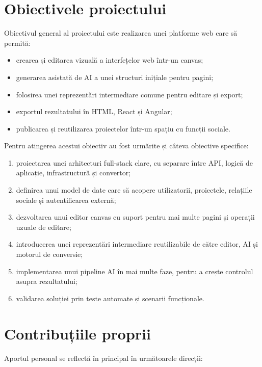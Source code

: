 \section{Obiectivele proiectului}

Obiectivul general al proiectului este realizarea unei platforme web care să permită:

\begin{itemize}[leftmargin=1.5cm]
  \item crearea și editarea vizuală a interfețelor web într-un canvas;
  \item generarea asistată de AI a unei structuri inițiale pentru pagini;
  \item folosirea unei reprezentări intermediare comune pentru editare și export;
  \item exportul rezultatului în HTML, React și Angular;
  \item publicarea și reutilizarea proiectelor într-un spațiu cu funcții sociale.
\end{itemize}

Pentru atingerea acestui obiectiv au fost urmărite și câteva obiective specifice:

\begin{enumerate}[leftmargin=1.5cm]
  \item proiectarea unei arhitecturi full-stack clare, cu separare între API, logică de aplicație, infrastructură și convertor;
  \item definirea unui model de date care să acopere utilizatorii, proiectele, relațiile sociale și autentificarea externă;
  \item dezvoltarea unui editor canvas cu suport pentru mai multe pagini și operații uzuale de editare;
  \item introducerea unei reprezentări intermediare reutilizabile de către editor, AI și motorul de conversie;
  \item implementarea unui pipeline AI în mai multe faze, pentru a crește controlul asupra rezultatului;
  \item validarea soluției prin teste automate și scenarii funcționale.
\end{enumerate}

\section{Contribuțiile proprii}

Aportul personal se reflectă în principal în următoarele direcții:

